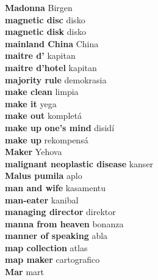 \textbf{ Madonna  } Birgen \\
\textbf{ magnetic disc  } disko \\
\textbf{ magnetic disk  } disko \\
\textbf{ mainland China  } China \\
\textbf{ maitre d’  } kapitan \\
\textbf{ maitre d’hotel  } kapitan \\
\textbf{ majority rule  } demokrasia \\
\textbf{ make clean  } limpia \\
\textbf{ make it  } yega \\
\textbf{ make out  } kompletá \\
\textbf{ make up one’s mind  } disidí \\
\textbf{ make up  } rekompensá \\
\textbf{ Maker  } Yehova \\
\textbf{ malignant neoplastic disease  } kanser \\
\textbf{ Malus pumila  } aplo \\
\textbf{ man and wife  } kasamentu \\
\textbf{ man-eater  } kanibal \\
\textbf{ managing director  } direktor \\
\textbf{ manna from heaven  } bonanza \\
\textbf{ manner of speaking  } abla \\
\textbf{ map collection  } atlas \\
\textbf{ map maker  } cartografico \\
\textbf{ Mar  } mart \\
